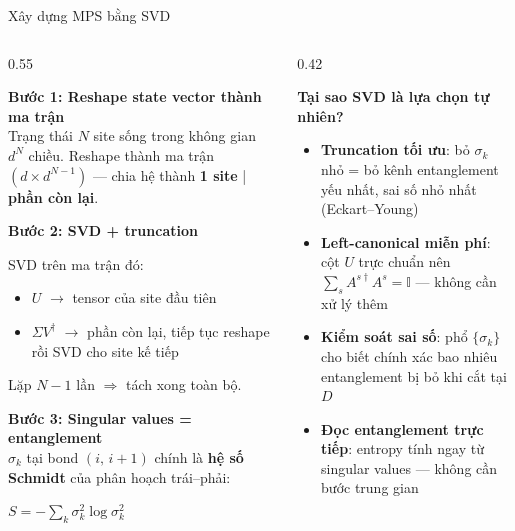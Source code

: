 \documentclass[aspectratio=169, 11pt]{beamer}
\newcommand{\eqn}[1]{\begin{center}\colorbox{eqbox}{\color{qcyan}$\displaystyle #1$}\end{center}}
\begin{document}
\begin{frame}[shrink=5]{Xây dựng MPS bằng SVD}

\begin{columns}[T]
\begin{column}{0.55\textwidth}

\textcolor{qcyan}{\textbf{Bước 1: Reshape state vector thành ma trận}}\\[2pt]
{\small Trạng thái $N$ site sống trong không gian $d^N$ chiều. Reshape thành ma trận $(d \times d^{N-1})$ — chia hệ thành \textbf{1 site} | \textbf{phần còn lại}.}

\vspace{6pt}
\textcolor{qcyan}{\textbf{Bước 2: SVD + truncation}}\\[2pt]
{\small SVD trên ma trận đó:
\begin{itemize}
  \item $U$ $\to$ tensor của site đầu tiên
  \item $\Sigma V^\dagger$ $\to$ phần còn lại, tiếp tục reshape rồi SVD cho site kế tiếp
\end{itemize}
Lặp $N{-}1$ lần $\Rightarrow$ tách xong toàn bộ.}

\vspace{6pt}
\textcolor{qcyan}{\textbf{Bước 3: Singular values = entanglement}}\\[2pt]
{\small $\sigma_k$ tại bond $(i,\,i{+}1)$ chính là \textbf{hệ số Schmidt} của phân hoạch trái–phải:}
\eqn{S = -\sum_k \sigma_k^2 \log \sigma_k^2}

\end{column}
\begin{column}{0.42\textwidth}

\vspace{2pt}
\textcolor{qamber}{\textbf{Tại sao SVD là lựa chọn tự nhiên?}}

\vspace{6pt}
{\small
\begin{itemize}
  \item \textbf{Truncation tối ưu}: bỏ $\sigma_k$ nhỏ = bỏ kênh entanglement yếu nhất, sai số nhỏ nhất (Eckart--Young)

  \item \textbf{Left-canonical miễn phí}: cột $U$ trực chuẩn nên $\sum_s A^{s\dagger}A^s = \mathbb{I}$ — không cần xử lý thêm

  \item \textbf{Kiểm soát sai số}: phổ $\{\sigma_k\}$ cho biết chính xác bao nhiêu entanglement bị bỏ khi cắt tại $D$

  \item \textbf{Đọc entanglement trực tiếp}: entropy tính ngay từ singular values — không cần bước trung gian
\end{itemize}}

\end{column}
\end{columns}

\end{frame}
\end{document}
